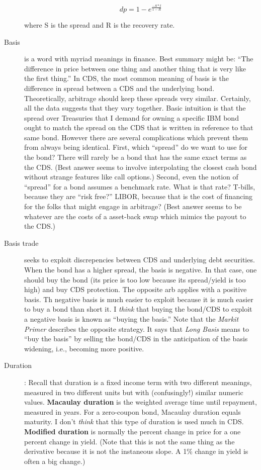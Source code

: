 \documentclass[12pt]{article}
\begin{document}
\begin{description}
\begin{displaymath}
  dp = 1 - e^{\frac{-S * t}{1-R}}
\end{displaymath}

where S is the spread and R is the recovery rate.

  
  \item[Basis] is a word with myriad meanings in finance. Best summary might be: ``The difference in price between one thing and another thing that is very like the first thing.'' In CDS, the most common meaning of basis is the difference in spread between a CDS and the underlying bond. Theoretically, arbitrage should keep these spreads very similar. Certainly, all the data suggests that they vary together. Basic intuition is that the spread over Treasuries that I demand for owning a specific IBM bond ought to match the spread on the CDS that is written in reference to that same bond. However there are several complications which prevent them from always being identical. First, which ``spread'' do we want to use for the bond? There will rarely be a bond that has the same exact terms as the CDS. (Best answer seems to involve interpolating the closest cash bond without strange features like call options.) Second, even the notion of ``spread'' for a bond assumes a benchmark rate. What is that rate? T-bills, because they are ``risk free?'' LIBOR, because that is the cost of financing for the folks that might engage in arbitrage? (Best answer seems to be whatever are the costs of a asset-back swap which mimics the payout to the CDS.) 

\item[Basis trade] seeks to exploit discrepencies between CDS and underlying debt securities. When the bond has a higher spread, the basis is negative. In that case, one should buy the bond (its price is too low because its spread/yield is too high) and buy CDS protection. The opposite arb applies with a positive basis. Th negative basis is much easier to exploit because it is much easier to buy a bond than short it. I \emph{think} that buying the bond/CDS to exploit a negative basis is known as ``buying the basis.'' Note that the \emph{Markit Primer} describes the opposite strategy. It says that \emph{Long Basis} means to ``buy the basis'' by selling the bond/CDS in the anticipation of the basis widening, i.e., becoming more positive.

  \item[Duration]: Recall that duration is a fixed income term with two different meanings, measured in two different units but with (confusingly!) similar numeric values. \textbf{Macaulay duration} is the weighted average time until repayment, measured in years. For a zero-coupon bond, Macaulay duration equals maturity. I don't \emph{think} that this type of duration is used much in CDS. \textbf{Modified duration} is normally the percent change in price for a one percent change in yield. (Note that this is not the same thing as the derivative because it is not the instaneous slope. A 1\% change in yield is often a big change.)
  

\end{description}
\end{document}
